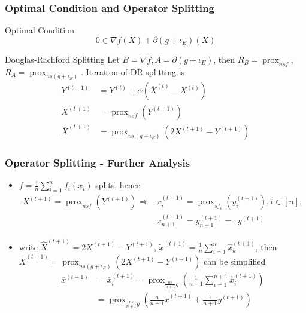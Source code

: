 
\begin{frame}
\frametitle{Optimal Condition and Operator Splitting}

\begin{block}{Optimal Condition}
\ 
\vspace{-1.3em}
$$0 \in \nabla f(X) + \partial (g + \iota_E)(X)$$
\end{block}

\begin{block}{Douglas-Rachford Splitting}
Let $B = \nabla f, A = \partial (g + \iota_E)$, then $R_B = \operatorname{prox}_{nsf}$, $R_A = \operatorname{prox}_{ns(g + \iota_E)}$. Iteration of DR splitting is
\begin{align*}
Y^{(t+1)} & = Y^{(t)} + \alpha (\overline{X}^{(t)} - X^{(t)}) \\
X^{(t+1)} & = \operatorname{prox}_{nsf}(Y^{(t+1)}) \\
\overline{X}^{(t+1)} & = \operatorname{prox}_{ns(g + \iota_E)}(2X^{(t+1)} - Y^{(t+1)})
\end{align*}
\end{block}

\end{frame}


\begin{frame}
\frametitle{Operator Splitting - Further Analysis}

\begin{itemize}
    \item $f = \frac{1}{n}\sum_{i=1}^n f_i(x_i)$ splits, hence
    \begin{align*}
        X^{(t+1)} = \operatorname{prox}_{nsf}(Y^{(t+1)}) \Rightarrow & x_i^{(t+1)} = \operatorname{prox}_{sf_i}(y_i^{(t+1)}), i\in [n]; \\
        & x_{n+1}^{(t+1)} = y_{n+1}^{(t+1)} =: y^{(t+1)}
    \end{align*}
    \item write $\widehat{X}^{(t+1)} = 2X^{(t+1)} - Y^{(t+1)}$, $\widetilde{x}^{(t+1)} = \frac{1}{n}\sum_{i=1}^n \widehat{x}_k^{(t+1)}$, then $\overline{X}^{(t+1)} = \operatorname{prox}_{ns(g + \iota_E)}(2X^{(t+1)} - Y^{(t+1)})$ can be simplified
    \begin{align*}
        \overline{x}^{(t+1)} & = \overline{x}_i^{(t+1)} = \operatorname{prox}_{\frac{ns}{n+1}g} \left( \frac{1}{n+1} \sum_{i=1}^{n+1} \widehat{x}_i^{(t+1)} \right) \\
        & = \operatorname{prox}_{\frac{ns}{n+1}g} \left( \frac{n}{n+1} \widetilde{x}^{(t+1)} + \frac{1}{n+1} y^{(t+1)} \right)
    \end{align*}
\end{itemize}

\end{frame}

